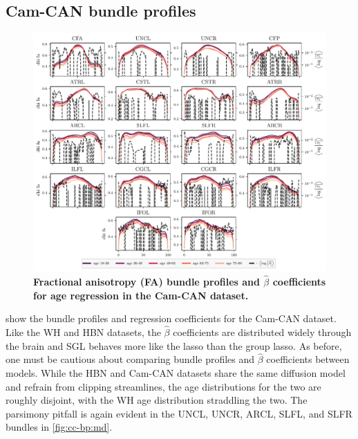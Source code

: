 \documentclass[10pt,%
               aps,%
               prl,%
               reprint,%
               superscriptaddress,%
               preprintnumbers,%
               linenumbers,%
               amsmath,%
               floatfix]{revtex4-2}
\begin{document}
\subsection{Cam-CAN bundle profiles}

\begin{figure}
    \includegraphics[width=\textwidth]{cc_coefs_profiles_fa.pdf}
    \caption{%
        {%
            \bf Fractional anisotropy (FA) bundle profiles and $\hat{\beta}$
            coefficients for age regression in the Cam-CAN dataset.
        }
        \label{fig:cc-bp:fa}
    }
\end{figure}

 show the bundle profiles and regression
coefficients for the Cam-CAN dataset. Like the WH and HBN datasets, the
$\hat{\beta}$ coefficients are distributed widely through the brain and SGL
behaves more like the lasso than the group lasso. As before, one must be
cautious about comparing bundle profiles and $\hat{\beta}$ coefficients
between models. While the HBN and Cam-CAN datasets share the same diffusion
model and refrain from clipping streamlines, the age distributions for the
two are roughly disjoint, with the WH age distribution straddling the two.
The parsimony pitfall is again evident in the UNCL, UNCR, ARCL, SLFL, and
SLFR bundles in \cref{fig:cc-bp:md}.
\end{document}

